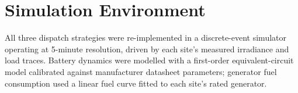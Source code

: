 \section{Simulation Environment}
All three dispatch strategies were re-implemented in a discrete-event simulator operating at
5-minute resolution, driven by each site's measured irradiance and load traces. Battery
dynamics were modelled with a first-order equivalent-circuit model calibrated against
manufacturer datasheet parameters; generator fuel consumption used a linear fuel curve fitted
to each site's rated generator.

